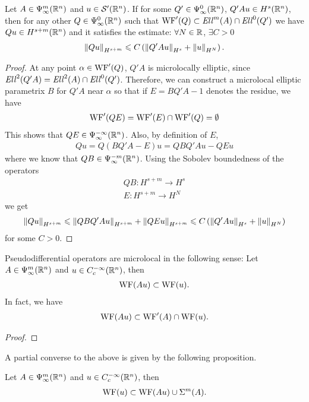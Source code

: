 \documentclass[12pt]{article}
\begin{document}
\begin{fprop}
    Let $A \in \Psi^{m}_{\infty}(\R^n)$ and $u \in \sch'(\R^n)$. If for some $Q' \in \Psi^{0}_{\infty}(\R^n)$, $Q'Au \in H^{s}(\R^n)$, then for any other $Q \in \Psi^{0}_{\infty}(\R^n)$ such that $\WF'(Q) \subset \Ell^m(A) \cap \Ell^0(Q')$ we have $Qu \in H^{s + m}(\R^n)$ and it satisfies the estimate: $\forall N \in \R$, $\exists C > 0$ 
    \begin{align*}
    \norm[Qu]_{H^{s +m}} \leq C \brac{\norm[Q'Au]_{H^s} + \norm[u]_{H^N}}. 
    \end{align*}
\end{fprop}
\begin{proof}
    At any point $\alpha \in \WF'(Q)$, $Q'A$ is microlocally elliptic, since $\Ell^2(Q'A) = \Ell^2(A) \cap \Ell^0(Q')$. Therefore, we can construct a microlocal elliptic parametrix $B$ for $Q'A$ near $\alpha$ so that if  $E = BQ'A - 1$ denotes the residue, we have 
    \begin{align*}
    \WF'(QE) = \WF'(E) \cap \WF'(Q) = \emptyset 
    \end{align*}
    This shows that $QE \in \Psi^{-\infty}_{\infty}(\R^n)$. Also, by definition of $E$, 
    \begin{align*}
    Qu = Q (BQ'A - E) u = QBQ'A u - QEu 
    \end{align*}
    where we know that $QB \in \Psi^{-m}_{\infty}(\R^n)$. Using the Sobolev boundedness of the operators
    \begin{align*}
    QB : H^{s + m} \to H^{s}\\
    E : H^{s + m} \to H^N
    \end{align*}
    we get
    \begin{align*}
    \norm[Qu]_{H^{s + m}} \leq \norm[QBQ'Au]_{H^{s + m}} + \norm[QEu]_{H^{s + m}} \leq C \brac{\norm[Q'Au]_{H^s} + \norm[u]_{H^N}}
    \end{align*}
    for some $C > 0$. 
    
\end{proof}


\begin{fprop}
    Pseudodifferential operators are microlocal in the following sense: 
    Let $A \in \Psi^m_\infty(\R^n)$ and $u \in C^{-\infty}_c(\R^n)$, then 
    \begin{align}
        \WF(Au) \subset \WF(u). 
    \end{align}
    In fact, we have 
    \begin{align*}
        \WF(Au) \subset \WF'(A) \cap \WF(u). 
    \end{align*}
\end{fprop}
\begin{proof}
    
\end{proof}

A partial converse to the above is given by the following proposition. \\

\begin{fprop}
    Let $A \in \Psi^m_\infty(\R^n)$ and $u \in C^{- \infty}_c(\R^n)$, then 
    \begin{align*}
        \WF(u) \subset \WF(Au) \cup \Char^m(A).
    \end{align*}
\end{fprop}
\end{document}

